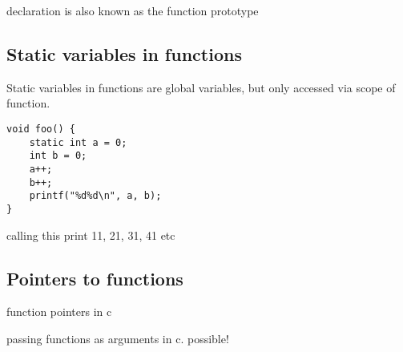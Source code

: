 declaration is also known as the function prototype

\subsection{Static variables in functions}

Static variables in functions are global variables, but only accessed via scope of function.

\begin{verbatim}
void foo() {
    static int a = 0;
    int b = 0;
    a++;
    b++;
    printf("%d%d\n", a, b);
}
\end{verbatim}

calling this print 11, 21, 31, 41 etc

\subsection{Pointers to functions}

function pointers in c

passing functions as arguments in c. possible!

